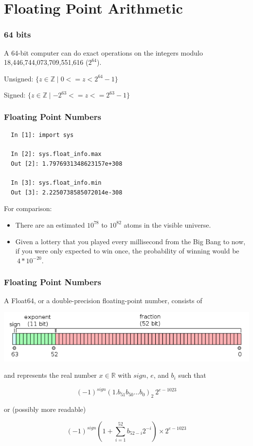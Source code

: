 \documentclass{beamer}
\def\R{\mathbb{R}}                     %
\begin{document}
\section{Floating Point Arithmetic}

\begin{frame}

\frametitle{64 bits}

A 64-bit computer can do exact operations on the integers modulo 18,446,744,073,709,551,616 ($2^{64}$). \linebreak[2]

Unsigned: $\{z \in \mathbb{Z} \mid 0 <= z < 2^{64}-1 \}$ \linebreak[2]

Signed: $\{z \in \mathbb{Z} \mid -2^{63} <= z <= 2^{63}-1 \}$

\end{frame}

\begin{frame}[fragile]

\frametitle{Floating Point Numbers}

\begin{lstlisting}
  In [1]: import sys

  In [2]: sys.float_info.max
  Out [2]: 1.7976931348623157e+308

  In [3]: sys.float_info.min
  Out [3]: 2.2250738585072014e-308

\end{lstlisting}

\pause

For comparison:

\begin{itemize}[<+->]
  \item There are an estimated $10^{78}$ to $10^{82}$ atoms in the visible universe.
  \item Given a lottery that you played every millisecond from the Big Bang to now, if you were only expected to win once, the probability of winning would be $~4*10^{-20}$.
\end{itemize}

\end{frame}

\begin{frame}
\frametitle{Floating Point Numbers}

A Float64, or a double-precision floating-point number, consists of

\includegraphics[scale=.4]{float-format.png}

and represents the real number $x \in \R$ with $sign$, $e$, and $b_i$ such that

\[ (-1)^{sign} (1.b_{51}b_{50}...b_{0})_2 \ 2^{e-1023} \]

or (possibly more readable)

\[ (-1)^{sign} \left ( 1 + \sum_{i=1}^{52} b_{52-i} 2^{-i} \right ) \times 2^{e-1023} \]

\end{frame}
\end{document}
